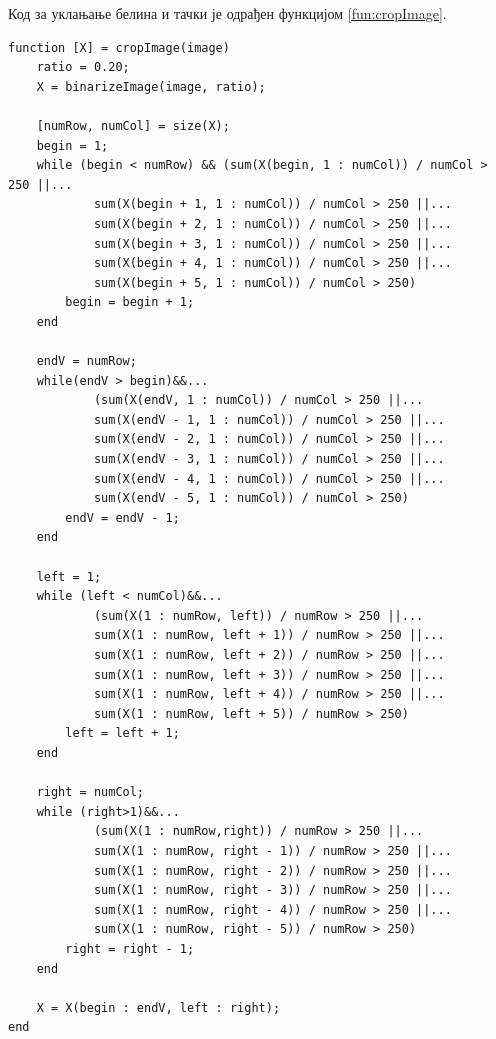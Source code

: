 Код за уклањање белина и тачки је одрађен функцијом \ref{fun:cropImage}.

\begin{lstlisting}[caption={Одсецање слике},label={fun:cropImage}]
function [X] = cropImage(image)
    ratio = 0.20;
    X = binarizeImage(image, ratio);
    
    [numRow, numCol] = size(X);
    begin = 1;
    while (begin < numRow) && (sum(X(begin, 1 : numCol)) / numCol > 250 ||...
            sum(X(begin + 1, 1 : numCol)) / numCol > 250 ||...
            sum(X(begin + 2, 1 : numCol)) / numCol > 250 ||...
            sum(X(begin + 3, 1 : numCol)) / numCol > 250 ||...
            sum(X(begin + 4, 1 : numCol)) / numCol > 250 ||...
            sum(X(begin + 5, 1 : numCol)) / numCol > 250)
        begin = begin + 1;
    end

    endV = numRow;
    while(endV > begin)&&...
            (sum(X(endV, 1 : numCol)) / numCol > 250 ||...
            sum(X(endV - 1, 1 : numCol)) / numCol > 250 ||...
            sum(X(endV - 2, 1 : numCol)) / numCol > 250 ||...
            sum(X(endV - 3, 1 : numCol)) / numCol > 250 ||...
            sum(X(endV - 4, 1 : numCol)) / numCol > 250 ||...
            sum(X(endV - 5, 1 : numCol)) / numCol > 250)
        endV = endV - 1;
    end

    left = 1;
    while (left < numCol)&&...
            (sum(X(1 : numRow, left)) / numRow > 250 ||...
            sum(X(1 : numRow, left + 1)) / numRow > 250 ||...
            sum(X(1 : numRow, left + 2)) / numRow > 250 ||...
            sum(X(1 : numRow, left + 3)) / numRow > 250 ||...
            sum(X(1 : numRow, left + 4)) / numRow > 250 ||...
            sum(X(1 : numRow, left + 5)) / numRow > 250)
        left = left + 1;
    end

    right = numCol;
    while (right>1)&&...
            (sum(X(1 : numRow,right)) / numRow > 250 ||...
            sum(X(1 : numRow, right - 1)) / numRow > 250 ||...
            sum(X(1 : numRow, right - 2)) / numRow > 250 ||...
            sum(X(1 : numRow, right - 3)) / numRow > 250 ||...
            sum(X(1 : numRow, right - 4)) / numRow > 250 ||...
            sum(X(1 : numRow, right - 5)) / numRow > 250)
        right = right - 1;
    end

    X = X(begin : endV, left : right);
end

\end{lstlisting}


